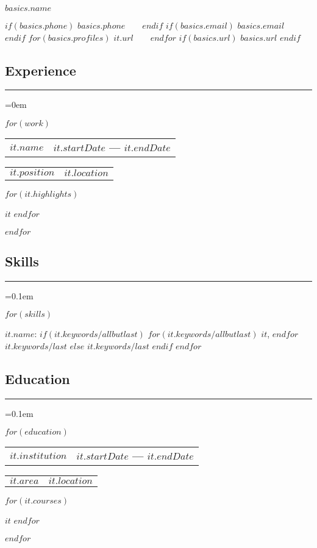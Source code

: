 \documentclass[10pt,letterpaper]{article}
\makeatletter
\newenvironment{indentsection}[1]%
{\begin{list}{}%
	{\setlength{\leftmargin}{#1}}%
	\item[]%
}
{\end{list}}
\def\sectionSpace{\vspace{-10pt}}
\newcommand\resumesection[1]
{\subsection*{#1}
\vspace{-0.2em}
\hrule
\vspace{0.4em}}
\newcommand\headerrow[2]
{\begin{tabular*}{\linewidth}{l@{\extracolsep{\fill}}r}
    #1 &
	#2 \\
\end{tabular*}}
\makeatother
\begin{document}
\begin{center}
{\LARGE \textbf{$basics.name$}}
\vspace{0.4em}

$if(basics.phone)$
    $basics.phone$\ \
    \textbullet \ \
$endif$
$if(basics.email)$
    \href{mailto:$basics.email$}{$basics.email$}\ \
    \textbullet \ \
$endif$
$for(basics.profiles)$
    \href{https://$it.url$}{$it.url$}\ \
    \textbullet \ \
$endfor$
$if(basics.url)$
    \href{https://$basics.url$}{$basics.url$}
$endif$
\end{center}
\vspace{-16pt}

\resumesection{Experience}
\parskip=0em

    $for(work)$
    \headerrow
		{\textbf{$it.name$}}
		{\textbf{$it.startDate$ — $it.endDate$}}
	\vspace{-4pt}
	\headerrow
        {$it.position$}
		{$it.location$}
	\begin{itemize*}
        $for(it.highlights)$
	    \item $it$
        $endfor$
	\end{itemize*}
	\vspace{-2pt}
    $endfor$
    \sectionSpace

\resumesection{Skills}
\parskip=0.1em

	\begin{indentsection}{\parindent}
	\begin{description*}
        $for(skills)$
		\item[$it.name$:]
            $if(it.keywords/allbutlast)$
                $for(it.keywords/allbutlast)$
                    $it$,
                $endfor$
                $it.keywords/last$
            $else$
                $it.keywords/last$
            $endif$
        $endfor$
	\end{description*}
	\end{indentsection}
	\sectionSpace

\resumesection{Education}
\parskip=0.1em

    $for(education)$
	\headerrow
		{\textbf{$it.institution$}}
		{\textbf{$it.startDate$ — $it.endDate$}}
	\vspace{-5pt}
	\headerrow
		{$it.area$}
		{$it.location$}
    \begin{itemize*}
        $for(it.courses)$
        \item $it$
        $endfor$
    \end{itemize*}
	\vspace{-2pt}
    $endfor$
	\sectionSpace
\end{document}
